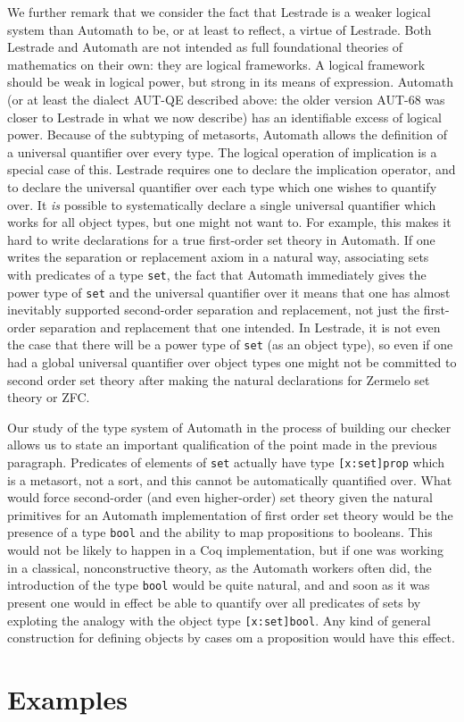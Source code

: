 \documentclass[12pt]{article}
\begin{document}
We further remark that we consider the fact that Lestrade is a weaker logical system than Automath to be, or at least to reflect, a virtue of Lestrade.  Both Lestrade and Automath are not intended as full foundational theories of mathematics on their own:  they are logical frameworks.  A logical framework should be weak in logical power, but strong in its means of expression.  Automath (or at least the dialect AUT-QE described above:  the older version AUT-68 was closer to Lestrade in what we now describe) has an identifiable excess of logical power.  Because of the subtyping of metasorts, Automath allows the definition of a universal quantifier over every type.  The logical operation of implication is a special case of this.
Lestrade requires  one to declare the implication operator, and to declare the universal quantifier over each type which one wishes to quantify over.  It {\em is\/} possible to systematically declare a single universal quantifier which works for all object  types, but one might not want to.  For example, this makes it hard to write declarations for a true first-order set theory in Automath.  If one writes the separation or replacement axiom in a natural way, associating sets with predicates of a type {\tt set\/}, the fact that Automath immediately gives the power type of {\tt set} and the universal quantifier over it means that one has almost inevitably supported second-order separation and replacement, not just the first-order separation and replacement that one intended.  In Lestrade, it is not even the case that there will be a power type of {\tt set} (as an object type), so even if one had a global universal quantifier over object types one might not be committed to second order set theory after making the natural declarations for Zermelo set theory or ZFC.

Our study of the type system of Automath in the process of building our checker allows us to state an important qualification of the point made in the previous paragraph.
Predicates of elements of {\tt set} actually have type {\tt [x:set]prop} which is a metasort, not a sort, and this cannot be automatically quantified over.  What would force second-order (and even higher-order) set theory given the natural primitives for an Automath implementation of first order set theory would be the presence of a type {\tt bool} and the ability to map propositions to booleans.  This would not be likely to happen in a Coq implementation, but if one was working in a classical, nonconstructive theory, as the Automath workers often did, the introduction of the type {\tt bool} would be quite natural, and and soon as it was present one would in effect be able to quantify over all predicates of sets by exploting the analogy with the object type {\tt [x:set]bool}.  Any kind of general construction for defining objects by cases om a proposition would have this effect.

\newpage

\section{Examples}
\end{document}
